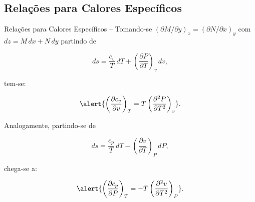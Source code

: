 \subsection{Relações para Calores Específicos}

    \begin{frame}[allowframebreaks]{Relações para Calores Específicos --}\vspace*{-0em}
        Tomando-se \alert{$(\partial M/\partial y)_x = (\partial N/\partial x)_y$}
        com \alert{$dz = M\,dx + N\,dy$} partindo de

        \begin{equation*}
            ds = 
                \frac{c_v}{T}\,dT +
                \left(
                    \frac{\partial P}{\partial T}
                \right)_v\,dv,
        \end{equation*}

        \noindent tem-se:

        \begin{equation*}
            \alert{
                \left(
                    \frac{\partial c_v}{\partial v}
                \right)_T =
                T\left(
                    \frac{\partial^2 P}{\partial T^2}
                \right)_v
            }.
        \end{equation*}

        \pagebreak
        Analogamente, partindo-se de

        \begin{equation*}
            ds = 
                \frac{c_p}{T}\,dT -
                \left(
                    \frac{\partial v}{\partial T}
                \right)_P\,dP,
        \end{equation*}

        \noindent chega-se a:

        \begin{equation*}
            \alert{
                \left(
                    \frac{\partial c_p}{\partial P}
                \right)_T =
                -T\left(
                    \frac{\partial^2 v}{\partial T^2}
                \right)_P
            }.
        \end{equation*}


\end{frame}
